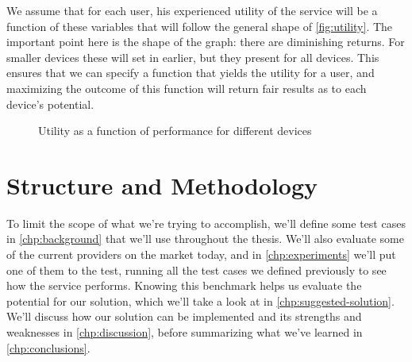 We assume that for each user, his experienced utility of the service will be a function of these variables that will follow the general shape of \autoref{fig:utility}. The important point here is the shape of the graph: there are diminishing returns. For smaller devices these will set in earlier, but they present for all devices. This ensures that we can specify a function that yields the utility for a user, and maximizing the outcome of this function will return fair results as to each device's potential.

\begin{figure}
    \centering
    \caption{Utility as a function of performance for different devices}
    \label{fig:utility}
\end{figure}


\section{Structure and Methodology}

To limit the scope of what we're trying to accomplish, we'll define some test cases in \autoref{chp:background} that we'll use throughout the thesis. We'll also evaluate some of the current providers on the market today, and in \autoref{chp:experiments} we'll put one of them to the test, running all the test cases we defined previously to see how the service performs. Knowing this benchmark helps us evaluate the potential for our solution, which we'll take a look at in \autoref{chp:suggested-solution}. We'll discuss how our solution can be implemented and its strengths and weaknesses in \autoref{chp:discussion}, before summarizing what we've learned in \autoref{chp:conclusions}.


